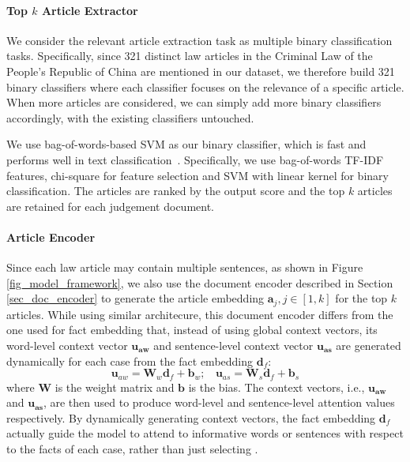 \paragraph{Top $k$ Article Extractor}
\label{sec_article_extractor}
We consider the relevant article extraction task as multiple binary classification tasks. Specifically, since 321 distinct law articles in the Criminal Law of the People's Republic of China are mentioned in our dataset, we therefore build 321 binary classifiers where each classifier focuses on the relevance of a specific article. When more articles are considered,
we can simply add more binary classifiers accordingly, with the existing classifiers untouched.

We use bag-of-words-based SVM as our binary classifier, which is fast and performs well in text classification~\cite{joachims2002learning,wang2012baselines}. Specifically, we use bag-of-words TF-IDF features, chi-square for feature selection and SVM with linear kernel for binary classification. The articles are ranked by the output score and the top $k$ articles are retained for each judgement document.

\paragraph{Article Encoder}
\label{sec_article_encoder}
Since each law article may contain multiple sentences, as shown in Figure \ref{fig_model_framework}, we also use the document encoder described in Section \ref{sec_doc_encoder} to generate the article embedding $\mathbf{a}_j, j\in [1, k]$ for the top $k$ articles. 
While using similar architecure, this document encoder differs from the one used for fact embedding that, instead of using global context vectors, its word-level context vector $\mathbf{u_{aw}}$ and sentence-level context vector $\mathbf{u_{as}}$ are generated dynamically for each case from the fact embedding $\mathbf{d}_f$:
\begin{equation}
\mathbf{u}_{aw} = \mathbf{W}_w \mathbf{d}_f + \mathbf{b}_w;\ \ \ \ \mathbf{u}_{as} = \mathbf{W}_s \mathbf{d}_f + \mathbf{b}_s
\label{eq_dynamic_context_vec}
\end{equation}
where $\mathbf{W}$ is the weight matrix and $\mathbf{b}$ is the bias. 
The context vectors, i.e., $\mathbf{u_{aw}}$ and $\mathbf{u_{as}}$, are then used to produce word-level and sentence-level attention values respectively.
By dynamically generating context vectors, the fact embedding $\mathbf{d}_f$ actually guide the model to attend to informative words or sentences with respect to the facts of each case, rather than just selecting .



